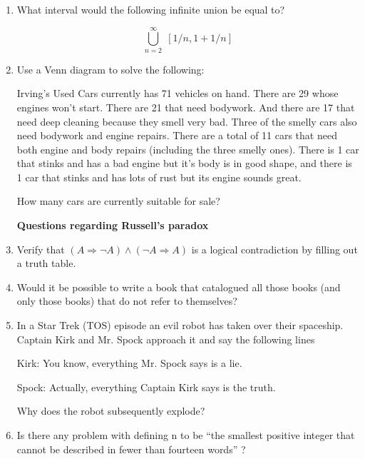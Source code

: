 \documentclass{amsart}
\begin{document}
\begin{enumerate}
\item What interval would the following infinite union be equal to?

\[ \bigcup_{n=2}^\infty \; \left[ 1/n, 1 + 1/n \right] \]

\vfill

\newpage

\item Use a Venn diagram to solve the following:

Irving’s Used Cars currently has 71 vehicles on hand. There are
29 whose engines won’t start. There are 21 that need bodywork.
And there are 17 that need deep cleaning because they smell very
bad. Three of the smelly cars also need bodywork and engine
repairs. There are a total of 11 cars that need both engine and
body repairs (including the three smelly ones). There is 1 car that
stinks and has a bad engine but it’s body is in good shape, and
there is 1 car that stinks and has lots of rust but its engine sounds
great.

How many cars are currently suitable for sale?

\vfill

\newpage

{\bf \large Questions regarding Russell's paradox}
\bigskip

\item Verify that $(A \Longrightarrow \lnot A) \wedge (\lnot A \Longrightarrow A)$ is a logical contradiction
by filling out a truth table.

\vfill

\item Would it be possible to write a book that catalogued all those books
(and only those books) that do not refer to themselves?

\vfill

\newpage

\item In a Star Trek (TOS) episode an evil robot has taken over their
spaceship. Captain Kirk and Mr. Spock approach it and say the
following lines

Kirk: You know, everything Mr. Spock says is a lie.

Spock: Actually, everything Captain Kirk says is the truth.

Why does the robot subsequently explode?

\vfill

\item Is there any problem with defining n to be “the smallest positive
integer that cannot be described in fewer than fourteen words” ?


\end{enumerate}
\end{document}
